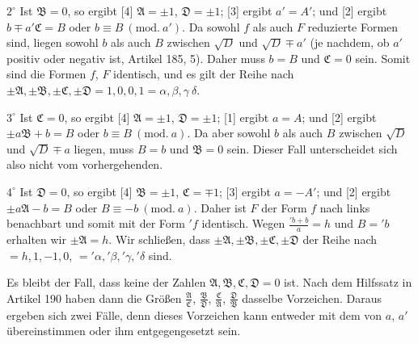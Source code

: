 $2^\circ$ Ist $\mathfrak{B}=0$, so ergibt [4] $\mathfrak{A}=\pm1$, $\mathfrak{D}=\pm1$; [3] ergibt $a'=A'$; und [2] ergibt $b\mp a'\mathfrak{C}=B$ oder $b\equiv B\ (\mathrm{mod.}\ a')$. Da sowohl $f$ als auch $F$ reduzierte Formen sind, liegen sowohl $b$ als auch $B$ zwischen $\surd D$ und $\surd D\mp a'$ (je nachdem, ob $a'$ positiv oder negativ ist, Artikel 185, 5). Daher muss $b=B$ und $\mathfrak{C}=0$ sein. Somit sind die Formen $f$, $F$ identisch, und es gilt der Reihe nach $\pm\mathfrak{A},\pm\mathfrak{B},\pm\mathfrak{C},\pm\mathfrak{D}=1,0,0,1=\alpha,\beta,\gamma\ \delta$.

$3^\circ$ Ist $\mathfrak{C}=0$, so ergibt [4] $\mathfrak{A}=\pm1$, $\mathfrak{D}=\pm1$; [1] ergibt $a=A$; und [2] ergibt $\pm a\mathfrak{B}+b=B$ oder $b\equiv B\ (\mathrm{mod.}\ a)$. Da aber sowohl $b$ als auch $B$ zwischen $\surd D$
und $\surd D\mp a$ liegen, muss $B=b$ und $\mathfrak{B}=0$ sein. Dieser Fall unterscheidet sich also nicht vom vorhergehenden.

$4^\circ$ Ist $\mathfrak{D}=0$, so ergibt [4] $\mathfrak{B}=\pm1$, $\mathfrak{C}=\mp1$; [3] ergibt $a=-A'$; und [2] ergibt $\pm a\mathfrak{A}-b=B$ oder $B\equiv-b\ (\mathrm{mod.}\ a)$. Daher ist $F$ der Form $f$ nach links benachbart und somit mit der Form ${}'f$ identisch. Wegen $\frac{{}'b+b}{a}=h$ und $B={}'b$ erhalten wir $\pm\mathfrak{A}=h$. Wir schließen, dass $\pm\mathfrak{A},\pm\mathfrak{B},\pm\mathfrak{C},\pm\mathfrak{D}$ der Reihe nach $=h,1,-1,0$, $={}'\alpha,{}'\beta,{}'\gamma,{}'\delta$ sind.

Es bleibt der Fall, dass keine der Zahlen $\mathfrak{A},\mathfrak{B},\mathfrak{C},\mathfrak{D}=0$ ist. Nach dem Hilfssatz in Artikel 190 haben dann die Größen $\frac{\mathfrak{A}}{\mathfrak{C}}$, $\frac{\mathfrak{B}}{\mathfrak{D}}$, $\frac{\mathfrak{C}}{\mathfrak{A}}$, $\frac{\mathfrak{D}}{\mathfrak{B}}$ dasselbe Vorzeichen. Daraus ergeben sich zwei Fälle, denn dieses Vorzeichen kann entweder mit dem von $a$, $a'$ übereinstimmen oder ihm entgegengesetzt sein.

